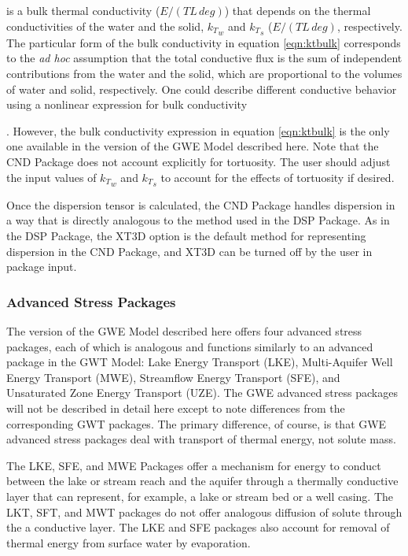 \noindent is a bulk thermal conductivity ($E/(T L \, deg)$) that depends on the thermal conductivities of the water and the solid, ${k_T}_w$ and ${k_T}_s$  ($E/(T L \, deg)$, respectively. The particular form of the bulk conductivity in equation \ref{eqn:ktbulk} corresponds to the \textit{ad hoc} assumption that the total conductive flux is the sum of independent contributions from the water and the solid, which are proportional to the volumes of water and solid, respectively. One could describe different conductive behavior using a nonlinear expression for bulk conductivity {\citep{campbell1994, markle2006}.  However, the bulk conductivity expression in equation \ref{eqn:ktbulk} is the only one available in the version of the GWE Model described here. Note that the CND Package does not account explicitly for tortuosity. The user should adjust the input values of ${k_T}_w$ and ${k_T}_s$ to account for the effects of tortuosity if desired.

Once the dispersion tensor is calculated, the CND Package handles dispersion in a way that is directly analogous to the method used in the DSP Package. As in the DSP Package, the XT3D option is the default method for representing dispersion in the CND Package, and XT3D can be turned off by the user in package input.

\subsubsection{Advanced Stress Packages}

The version of the GWE Model described here offers four advanced stress packages, each of which is analogous and functions similarly to an advanced package in the GWT Model: Lake Energy Transport (LKE), Multi-Aquifer Well Energy Transport (MWE), Streamflow Energy Transport (SFE), and Unsaturated Zone Energy Transport (UZE). The GWE advanced stress packages will not be described in detail here except to note differences from the corresponding GWT packages. The primary difference, of course, is that GWE advanced stress packages deal with transport of thermal energy, not solute mass.

The LKE, SFE, and MWE Packages offer a mechanism for energy to conduct between the lake or stream reach and the aquifer through a thermally conductive layer that can represent, for example,  a lake or stream bed or a well casing. The LKT, SFT, and MWT packages do not offer analogous diffusion of solute through the a conductive layer. The LKE and SFE packages also account for removal of thermal energy from surface water by evaporation.

}
